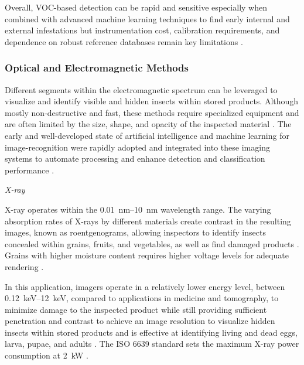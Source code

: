 \documentclass[../Vibro-Acoustic Signatures and Detection Algorithms for Stored Product Insects.tex]{subfiles}
\begin{document}
Overall, VOC-based detection can be rapid and sensitive especially when combined with advanced machine learning techniques to find early internal and external infestations but instrumentation cost, calibration requirements, and dependence on robust reference databases remain key limitations \cite{gongTechnologiesSystemsPest2026}.

\newpage
\subsubsection{Optical and Electromagnetic Methods}

Different segments within the electromagnetic spectrum can be leveraged to visualize and identify visible and hidden insects within stored products. Although mostly non-destructive and fast, these methods require specialized equipment and are often limited by the size, shape, and opacity of the inspected material \cite{neethirajanDetectionTechniquesStoredProduct2007}. The early and well-developed state of artificial intelligence and machine learning for image-recognition were rapidly adopted and integrated into these imaging systems to automate processing and enhance detection and classification performance \cite{christopherridgwayImagingHighSpeedDetection2001, devipriyar.InsectPestDetection2022}.

\textit{X-ray}

X-ray operates within the \SIrange{0.01}{10}{\nano\meter} wavelength range. The varying absorption rates of X-rays by different materials create contrast in the resulting images, known as roentgenograms, allowing inspectors to identify insects concealed within grains, fruits, and vegetables, as well as find damaged products \cite{XRayInspectionSystems2023, XRayDetectionFood2023}. Grains with higher moisture content requires higher voltage levels for adequate rendering \cite{ISO6639Cereals1986}.

In this application, imagers operate in a relatively lower energy level, between \SIrange{0.12}{12}{\kilo\electronvolt}, compared to applications in medicine and tomography, to minimize damage to the inspected product while still providing sufficient penetration and contrast to achieve an image resolution to visualize hidden insects within stored products and is effective at identifying living and dead eggs, larva, pupae, and adults \cite{gongTechnologiesSystemsPest2026}. The ISO 6639 standard sets the maximum X-ray power consumption at \SI{2}{\kilo\watt} \cite{ISO6639Cereals1986}.
\end{document}
